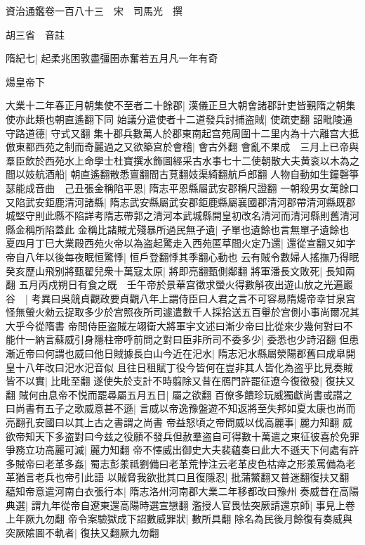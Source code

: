 資治通鑑卷一百八十三　宋　司馬光　撰

胡三省　音註

隋紀七|{
	起柔兆困敦盡彊圉赤奮若五月凡一年有奇}


煬皇帝下

大業十二年春正月朝集使不至者二十餘郡|{
	漢儀正旦大朝會諸郡計吏皆覲隋之朝集使亦此類也朝直遙翻下同}
始議分遣使者十二道發兵討捕盗賊|{
	使疏吏翻}
詔毗陵通守路道德|{
	守式又翻}
集十郡兵數萬人於郡東南起宫苑周圍十二里内為十六離宫大抵倣東都西苑之制而奇麗過之又欲築宫於會稽|{
	會古外翻}
會亂不果成　三月上已帝與羣臣飲於西苑水上命學士杜寶撰水飾圖經采古水事七十二使朝散大夫黄衮以木為之間以妓航酒船|{
	朝直遙翻散悉亶翻間古莧翻妓渠綺翻航戶郎翻}
人物自動如生鐘磬箏瑟能成音曲　己丑張金稱陷平恩|{
	隋志平恩縣屬武安郡稱尺證翻}
一朝殺男女萬餘口又陷武安鉅鹿清河諸縣|{
	隋志武安縣屬武安郡鉅鹿縣屬襄國郡清河郡帶清河縣既郡城堅守則此縣不陷詳考隋志帶郭之清河本武城縣開皇初改名清河而清河縣則舊清河縣金稱所陷蓋此}
金稱比諸賊尤殘暴所過民無孑遺|{
	孑單也遺餘也言無單孑遺餘也}
夏四月丁巳大業殿西苑火帝以為盗起驚走入西苑匿草間火定乃還|{
	還從宣翻又如字}
帝自八年以後每夜眠恒驚悸|{
	恒戶登翻悸其季翻心動也}
云有賊令數婦人搖撫乃得眠　癸亥歷山飛别將甄翟兒衆十萬寇太原|{
	將即亮翻甄側鄰翻}
將軍潘長文敗死|{
	長知兩翻}
五月丙戍朔日有食之既　壬午帝於景華宫徵求螢火得數斛夜出遊山放之光遍巖谷　|{
	考異曰吳競貞觀政要貞觀八年上謂侍臣曰人君之言不可容易隋煬帝幸甘泉宫怪無螢火勑云捉取多少於宫照夜所司遽遣數千人採拾送五百轝於宫側小事尚爾况其大乎今從隋書}
帝問侍臣盗賊左翊衛大將軍宇文述曰漸少帝曰比從來少幾何對曰不能什一納言蘇威引身隱柱帝呼前問之對曰臣非所司不委多少|{
	委悉也少詩沼翻}
但患漸近帝曰何謂也威曰他日賊據長白山今近在汜水|{
	隋志汜水縣屬滎陽郡舊曰成臯開皇十八年改曰汜水汜音似}
且往日租賦丁役今皆何在豈非其人皆化為盗乎比見奏賊皆不以實|{
	比毗至翻}
遂使失於支計不時翦除又昔在鴈門許罷征遼今復徵發|{
	復扶又翻}
賊何由息帝不悦而罷尋屬五月五日|{
	屬之欲翻}
百僚多饋珍玩威獨獻尚書或譛之曰尚書有五子之歌威意甚不遜|{
	言威以帝逸豫盤遊不知返將至失邦如夏太康也尚而亮翻孔安國曰以其上古之書謂之尚書}
帝益怒頃之帝問威以伐高麗事|{
	麗力知翻}
威欲帝知天下多盗對曰今兹之役願不發兵但赦羣盗自可得數十萬遣之東征彼喜於免罪爭務立功高麗可滅|{
	麗力知翻}
帝不懌威出御史大夫裴藴奏曰此大不遜天下何處有許多賊帝曰老革多姦|{
	蜀志彭羕祗劉備曰老革荒悖注云老革皮色枯瘁之形羕罵備為老革猶言老兵也帝引此語}
以賊脅我欲批其口且復隱忍|{
	批蒲鱉翻又普迷翻復扶又翻}
藴知帝意遣河南白衣張行本|{
	隋志洛州河南郡大業二年移都改曰豫州}
奏威昔在高陽典選|{
	謂九年從帝自遼東還高陽時選宣戀翻}
濫授人官畏怯突厥請還京師|{
	事見上卷上年厥九勿翻}
帝令案驗獄成下詔數威罪狀|{
	數所具翻}
除名為民後月餘復有奏威與突厥隂圖不軌者|{
	復扶又翻厥九勿翻}
